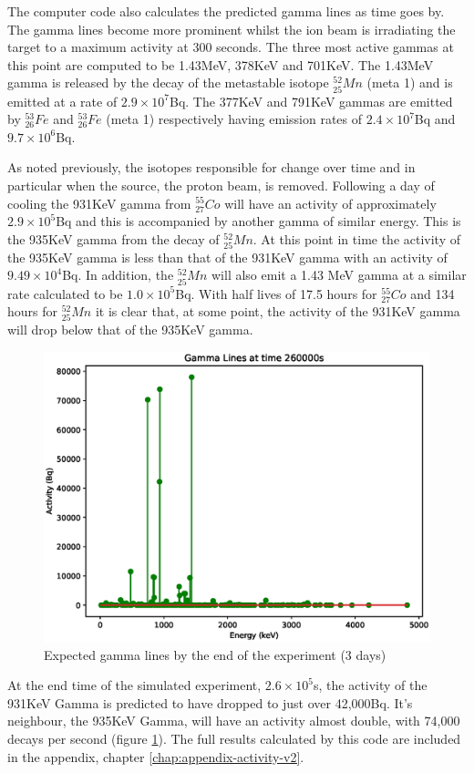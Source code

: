 The computer code also calculates the predicted gamma lines as time goes by.  The gamma lines become more prominent whilst the ion beam is irradiating the target to a maximum activity at 300 seconds.  The three most active gammas at this point are computed to be 1.43MeV, 378KeV and 701KeV.  The 1.43MeV gamma is released by the decay of the metastable isotope ${}^{52}_{25}Mn$ (meta 1) and is emitted at a rate of $2.9 \times 10^7$Bq.  The 377KeV and 791KeV gammas are emitted by ${}^{53}_{26}Fe$ and ${}^{53}_{26}Fe$ (meta 1) respectively having emission rates of $2.4 \times 10^7$Bq and $9.7 \times 10^{6}$Bq.

As noted previously, the isotopes responsible for change over time and in particular when the source, the proton beam, is removed.  Following a day of cooling the 931KeV gamma from ${}^{55}_{27}Co$ will have an activity of approximately $2.9 \times 10^5$Bq and this is accompanied by another gamma of similar energy.  This is the 935KeV gamma from the decay of ${}^{52}_{25}Mn$.  At this point in time the activity of the 935KeV gamma is less than that of the 931KeV gamma with an activity of $9.49 \times 10^4$Bq.  In addition, the ${}^{52}_{25} Mn$ will also emit a 1.43 MeV gamma at a similar rate calculated to be $1.0 \times 10^5$Bq.  With half lives of 17.5 hours for ${}^{55}_{27} Co$ and 134 hours for ${}^{52}_{25} Mn$ it is clear that, at some point, the activity of the 931KeV gamma will drop below that of the 935KeV gamma.

\FloatBarrier
\begin{figure}[!htb]
\centering
\includegraphics[width=0.6\linewidth]{chapters/activity_code/fe-activity-v2/gammas/0300_260000.eps}
\caption{Expected gamma lines by the end of the experiment (3 days)}
\label{fig:act2totalactivity}
\end{figure}

At the end time of the simulated experiment, $2.6 \times 10^5$s, the activity of the 931KeV Gamma is predicted to have dropped to just over 42,000Bq.  It's neighbour, the 935KeV Gamma, will have an activity almost double, with 74,000 decays per second (figure \ref{fig:act2totalactivity}).  The full results calculated by this code are included in the appendix, chapter \ref{chap:appendix-activity-v2}.  

